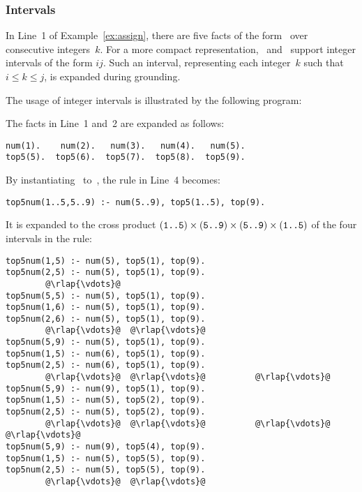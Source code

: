 \subsubsection{Intervals}\label{subsec:gringo:interval}

In Line~1 of Example~\ref{ex:assign},
there are five facts of the form~
over consecutive integers~$k$.
For a more compact representation,
\gringo\ and \clingo\ support integer intervals of the form $i$$j$.
Such an interval, representing each integer~$k$ such that $i\leq k\leq j$,
is expanded during grounding.

\begin{example}\label{ex:int}
The usage of integer intervals is illustrated by the following program:
%

%
The facts in Line~1 and~2 are expanded as follows:
%
\begin{lstlisting}[numbers=none]
num(1).    num(2).   num(3).   num(4).   num(5).
top5(5).  top5(6).  top5(7).  top5(8).  top5(9).
\end{lstlisting}
%
By instantiating~ to~,
the rule in Line~4 becomes:
%
\begin{lstlisting}[numbers=none]
top5num(1..5,5..9) :- num(5..9), top5(1..5), top(9).
\end{lstlisting}
%
It is expanded to the cross product
$(\texttt{\texttt{1}..\texttt{5}})\times
 (\texttt{\texttt{5}..\texttt{9}})\times
 (\texttt{\texttt{5}..\texttt{9}})\times
 (\texttt{\texttt{1}..\texttt{5}})$
of the four intervals in the rule:
%
\begin{lstlisting}[numbers=none,escapechar=@]
top5num(1,5) :- num(5), top5(1), top(9).
top5num(2,5) :- num(5), top5(1), top(9).
        @\rlap{\vdots}@
top5num(5,5) :- num(5), top5(1), top(9).
top5num(1,6) :- num(5), top5(1), top(9).
top5num(2,6) :- num(5), top5(1), top(9).
        @\rlap{\vdots}@  @\rlap{\vdots}@
top5num(5,9) :- num(5), top5(1), top(9).
top5num(1,5) :- num(6), top5(1), top(9).
top5num(2,5) :- num(6), top5(1), top(9).
        @\rlap{\vdots}@  @\rlap{\vdots}@          @\rlap{\vdots}@
top5num(5,9) :- num(9), top5(1), top(9).
top5num(1,5) :- num(5), top5(2), top(9).
top5num(2,5) :- num(5), top5(2), top(9).
        @\rlap{\vdots}@  @\rlap{\vdots}@          @\rlap{\vdots}@         @\rlap{\vdots}@
top5num(5,9) :- num(9), top5(4), top(9).
top5num(1,5) :- num(5), top5(5), top(9).
top5num(2,5) :- num(5), top5(5), top(9).
        @\rlap{\vdots}@  @\rlap{\vdots}@

\end{lstlisting}
\end{example}
